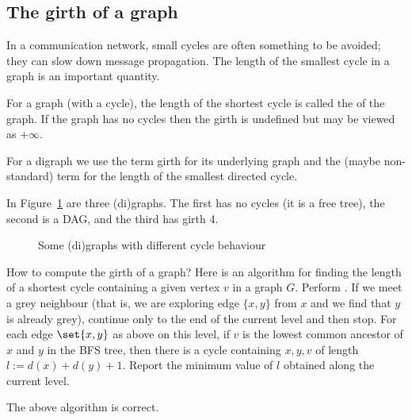 \subsection{The girth of a graph}
\label{subssec:girth}

In a communication network, small cycles are often something to be
avoided; they can slow down message propagation. The length of the
smallest cycle in a graph is an important quantity.

\begin{Definition}

For a graph (with a cycle), the length of the shortest cycle is called
the  of the graph. If the graph has no cycles then the
girth is undefined but may be viewed as $+\infty$.

\end{Definition}

\begin{note} For a digraph we use the term girth for its underlying
graph and the (maybe non-standard) term  for
the length of the smallest directed cycle.

\end{note}

\begin{Example}
\label{eg:cycles}
In Figure~\ref{fig:cycle} are three (di)graphs.  The first has no cycles (it is a free tree), the second is a DAG, and the third has  girth 4.
\end{Example}

\begin{figure}
\label{fig:cycle}

\centerline{}
\caption{Some (di)graphs with different cycle behaviour}
\end{figure}

How to compute the girth of a graph? Here is an algorithm for finding
the length of a shortest cycle containing a given vertex $v$ in a graph
$G$. Perform . If we meet a grey neighbour (that is,
we are exploring edge $\{x, y\}$ from $x$ and we find that $y$ is already
grey), continue only to the end of the current level and then stop. For
each edge $\set{x, y}$ as above on this level, if $v$ is the lowest
common ancestor of $x$ and $y$ in the BFS tree, then there is a cycle
containing $x, y, v$ of length $l:=d(x) + d(y) + 1$. Report the minimum
value of $l$ obtained along the current level.

\begin{Theorem}
\label{thm:BFS-cycle} 

The above algorithm is correct.

\end{Theorem}


